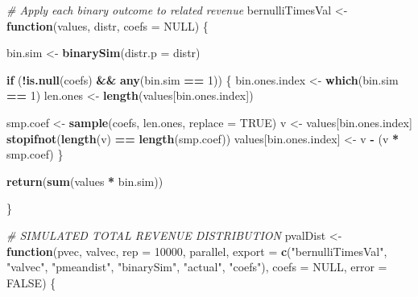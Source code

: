 \documentclass[]{article}
\newenvironment{Shaded}{\begin{snugshade}}{\end{snugshade}}
\newcommand{\CommentTok}[1]{\textcolor[rgb]{0.56,0.35,0.01}{\textit{#1}}}
\newcommand{\ControlFlowTok}[1]{\textcolor[rgb]{0.13,0.29,0.53}{\textbf{#1}}}
\newcommand{\DataTypeTok}[1]{\textcolor[rgb]{0.13,0.29,0.53}{#1}}
\newcommand{\DecValTok}[1]{\textcolor[rgb]{0.00,0.00,0.81}{#1}}
\newcommand{\KeywordTok}[1]{\textcolor[rgb]{0.13,0.29,0.53}{\textbf{#1}}}
\newcommand{\NormalTok}[1]{#1}
\newcommand{\OperatorTok}[1]{\textcolor[rgb]{0.81,0.36,0.00}{\textbf{#1}}}
\newcommand{\OtherTok}[1]{\textcolor[rgb]{0.56,0.35,0.01}{#1}}
\newcommand{\StringTok}[1]{\textcolor[rgb]{0.31,0.60,0.02}{#1}}
\begin{document}
\begin{Shaded}
\begin{Highlighting}[]
\CommentTok{# Apply each binary outcome to related revenue}
\NormalTok{bernulliTimesVal <-}\StringTok{ }\ControlFlowTok{function}\NormalTok{(values, distr, }\DataTypeTok{coefs =} \OtherTok{NULL}\NormalTok{) \{}

\NormalTok{        bin.sim <-}\StringTok{ }\KeywordTok{binarySim}\NormalTok{(}\DataTypeTok{distr.p =}\NormalTok{ distr)}
        
        \ControlFlowTok{if}\NormalTok{ (}\OperatorTok{!}\KeywordTok{is.null}\NormalTok{(coefs) }\OperatorTok{&&}\StringTok{ }\KeywordTok{any}\NormalTok{(bin.sim }\OperatorTok{==}\StringTok{ }\DecValTok{1}\NormalTok{)) \{}
\NormalTok{                bin.ones.index <-}\StringTok{ }\KeywordTok{which}\NormalTok{(bin.sim }\OperatorTok{==}\StringTok{ }\DecValTok{1}\NormalTok{)}
\NormalTok{                len.ones <-}\StringTok{ }\KeywordTok{length}\NormalTok{(values[bin.ones.index])}
                
\NormalTok{                smp.coef <-}\StringTok{ }\KeywordTok{sample}\NormalTok{(coefs, len.ones, }\DataTypeTok{replace =} \OtherTok{TRUE}\NormalTok{)}
\NormalTok{                v <-}\StringTok{ }\NormalTok{values[bin.ones.index]}
                \KeywordTok{stopifnot}\NormalTok{(}\KeywordTok{length}\NormalTok{(v) }\OperatorTok{==}\StringTok{ }\KeywordTok{length}\NormalTok{(smp.coef))}
\NormalTok{                values[bin.ones.index] <-}\StringTok{ }\NormalTok{v }\OperatorTok{-}\StringTok{ }\NormalTok{(v }\OperatorTok{*}\StringTok{ }\NormalTok{smp.coef)}
\NormalTok{        \}}
        
        \KeywordTok{return}\NormalTok{(}\KeywordTok{sum}\NormalTok{(values }\OperatorTok{*}\StringTok{ }\NormalTok{bin.sim))}

\NormalTok{\}}


\CommentTok{# SIMULATED TOTAL REVENUE DISTRIBUTION}
\NormalTok{pvalDist <-}\StringTok{ }\ControlFlowTok{function}\NormalTok{(pvec,}
\NormalTok{                     valvec,}
                     \DataTypeTok{rep =} \DecValTok{10000}\NormalTok{,}
\NormalTok{                     parallel,}
                     \DataTypeTok{export =} \KeywordTok{c}\NormalTok{(}\StringTok{"bernulliTimesVal"}\NormalTok{, }\StringTok{"valvec"}\NormalTok{,}
                                \StringTok{"pmeandist"}\NormalTok{, }\StringTok{"binarySim"}\NormalTok{, }\StringTok{"actual"}\NormalTok{, }\StringTok{"coefs"}\NormalTok{),}
                     \DataTypeTok{coefs =} \OtherTok{NULL}\NormalTok{,}
                     \DataTypeTok{error =} \OtherTok{FALSE}\NormalTok{) \{}
        

\end{Highlighting}
\end{Shaded}
\end{document}
